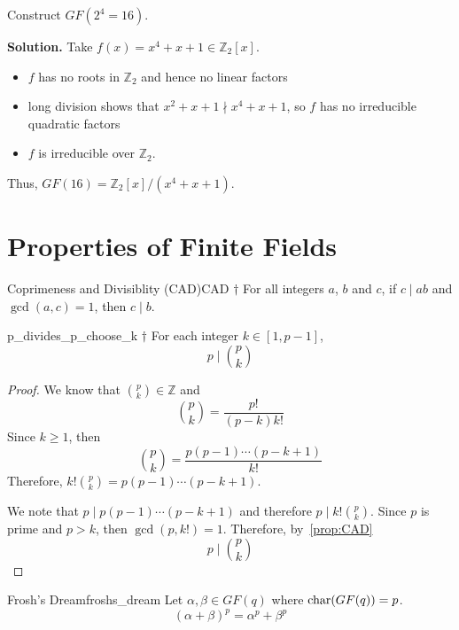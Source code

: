 
\begin{Example}{}{}
    Construct $ GF(2^4=16) $.

    \textbf{Solution.} Take $ f(x)=x^4+x+1\in\mathbb{Z}_2[x] $.
    \begin{itemize}
        \item $ f $ has no roots in $ \mathbb{Z}_2 $ and hence no linear factors
        \item long division shows that $ x^2+x+1\nmid x^4+x+1 $, so $ f $
              has no irreducible quadratic factors
        \item $ f $ is irreducible over $ \mathbb{Z}_2 $.
    \end{itemize}
    Thus, $ GF(16)=\mathbb{Z}_2[x]/(x^4+x+1) $.
\end{Example}

\section{Properties of Finite Fields}

\begin{Proposition}{Coprimeness and Divisiblity (CAD)}{CAD}
    $ \dagger $ For all integers $ a $, $ b $ and $ c $, if $ c\mid ab $
    and $ \gcd(a,c)=1 $, then $ c\mid b $.
\end{Proposition}

\begin{Lemma}{}{p_divides_p_choose_k}
    $ \dagger $ For each integer $ k\in[1,p-1] $,
    \[ p\mid \binom{p}{k} \]
\end{Lemma}

\begin{proof}
    We know that $ \binom{p}{k}\in\mathbb{Z} $ and
    \[ \binom{p}{k}=\frac{p!}{(p-k)k!} \]
    Since $ k\geqslant 1 $, then
    \[ \binom{p}{k}=\frac{p(p-1)\cdots(p-k+1)}{k!} \]
    Therefore, $ k!\binom{p}{k}=p(p-1)\cdots(p-k+1) $.

    We note that $ p\mid p(p-1)\cdots(p-k+1) $ and therefore
    $ p\mid k!\binom{p}{k} $. Since $ p $ is prime and $ p>k $,
    then $ \gcd(p,k!)=1 $. Therefore, by~\ref{prop:CAD}
    \[ p\mid \binom{p}{k} \]
\end{proof}

\begin{Theorem}{Frosh's Dream}{froshs_dream}
    Let $ \alpha,\beta\in GF(q) $ where $ \operatorname{char}(GF(q))=p $.
    \[ (\alpha + \beta)^p=\alpha^p+\beta^p \]
\end{Theorem}

